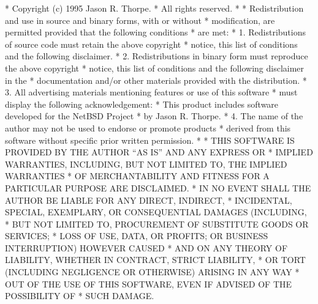 \begin{copyrightEnv}
 * Copyright (c) 1995 Jason R. Thorpe.
 * All rights reserved.
 *
 * Redistribution and use in source and binary forms, with or without
 * modification, are permitted provided that the following conditions
 * are met:
 * 1. Redistributions of source code must retain the above copyright
 *    notice, this list of conditions and the following disclaimer.
 * 2. Redistributions in binary form must reproduce the above copyright
 *    notice, this list of conditions and the following disclaimer in the
 *    documentation and/or other materials provided with the distribution.
 * 3. All advertising materials mentioning features or use of this software
 *    must display the following acknowledgement:
 *      This product includes software developed for the NetBSD Project
 *      by Jason R. Thorpe.
 * 4. The name of the author may not be used to endorse or promote products
 *    derived from this software without specific prior written permission.
 *
 * THIS SOFTWARE IS PROVIDED BY THE AUTHOR ``AS IS'' AND ANY EXPRESS OR
 * IMPLIED WARRANTIES, INCLUDING, BUT NOT LIMITED TO, THE IMPLIED WARRANTIES
 * OF MERCHANTABILITY AND FITNESS FOR A PARTICULAR PURPOSE ARE DISCLAIMED.
 * IN NO EVENT SHALL THE AUTHOR BE LIABLE FOR ANY DIRECT, INDIRECT,
 * INCIDENTAL, SPECIAL, EXEMPLARY, OR CONSEQUENTIAL DAMAGES (INCLUDING,
 * BUT NOT LIMITED TO, PROCUREMENT OF SUBSTITUTE GOODS OR SERVICES;
 * LOSS OF USE, DATA, OR PROFITS; OR BUSINESS INTERRUPTION) HOWEVER CAUSED
 * AND ON ANY THEORY OF LIABILITY, WHETHER IN CONTRACT, STRICT LIABILITY,
 * OR TORT (INCLUDING NEGLIGENCE OR OTHERWISE) ARISING IN ANY WAY
 * OUT OF THE USE OF THIS SOFTWARE, EVEN IF ADVISED OF THE POSSIBILITY OF
 * SUCH DAMAGE.
\end{copyrightEnv}

